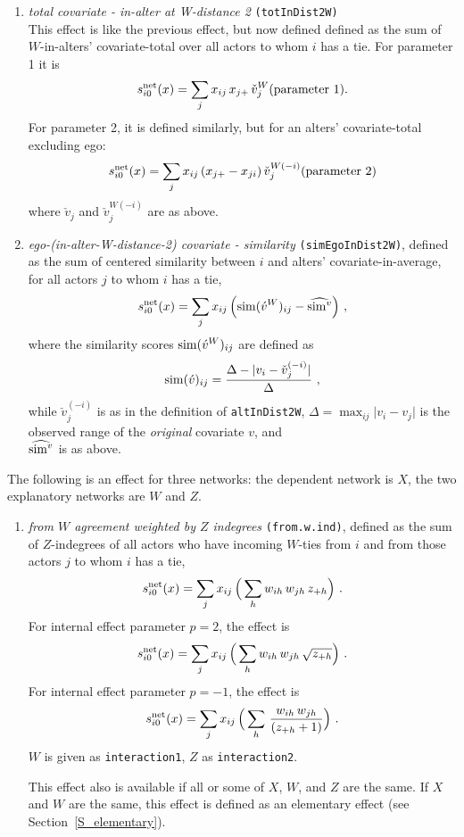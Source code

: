 \documentclass[a4paper,fleqn,11pt]{article}
\newcommand{\+}{\, + \,}
\newcommand{\vit}{\theenumi}
\newcounter{savenumi}
\begin{document}
\begin{enumerate}
\item \emph{total covariate - in-alter at W-distance 2} \texttt{(totInDist2W)} \\
      This effect is like the previous effect, but now defined
      defined as the sum of $W$-in-alters' covariate-total over all actors
      to whom $i$ has a tie. For parameter 1 it is
\[
 s^{\rm net}_{i\vit}(x) = \sum_j x_{ij}\, x_{j+} \, \check v_j^W \hfill (\text{parameter 1}). \hfill
\]
      For parameter 2, it is defined similarly,
      but for an alters' covariate-total excluding
      ego:
\[
 s^{\rm net}_{i\vit}(x) = \sum_j x_{ij} \, (x_{j+}  - x_{ji}) \,
               \check v_j^{W(-i)} \hfill (\text{parameter 2}) \hfill
\]
      where $ \check v_j$ and $ \check v_j^{W(-i)}$ are as above.

\item \emph{ego-(in-alter-W-distance-2) covariate - similarity} \texttt{(simEgoInDist2W)},
      defined as the sum of centered similarity  between $i$
      and alters' covariate-in-average, for all actors
      $j$ to whom $i$ has a tie,
\[
 s^{\rm net}_{i\vit}(x) = \sum_j x_{ij}\, \Big({\rm sim}(\acute v^W)_{ij}
  - \widehat{{\rm sim}^v}\Big) \ ,
\]
 where the similarity scores ${\rm sim}(\acute v^W)_{ij}$ are defined as
\[
{\rm sim}(\acute v)_{ij}=
 \frac{\Delta-\vert  v_i - \check v_j^{(-i)} \vert}{\Delta} \ ,
\]
 while
 $ \check v_j^{(-i)}$ is as in the definition of \texttt{altInDist2W},
 $\Delta=\max_{ij}\vert v_i - v_j \vert$ is the observed range of the
 \emph{original} covariate $v$, and\\
 $\widehat{{\rm sim}^v}$ is as above.

\setcounter{savenumi}{\value{enumi}}
\end{enumerate}

\noindent
The following is an effect for three networks:
the dependent network is $X$, the two explanatory networks are $W$ and $Z$.

\begin{enumerate}
\setcounter{enumi}{\value{savenumi}}
\item \emph{from $W$ agreement weighted by $Z$ indegrees} \texttt{(from.w.ind)},
      defined as the sum of $Z$-indegrees of all
      actors who have incoming $W$-ties from $i$ and from those actors
      $j$ to whom $i$ has a tie,
\[
 s^{\rm net}_{i\vit}(x) = \sum_j x_{ij}\,
        \Big( \sum_{h} w_{ih}\,w_{jh} \, z_{+h} \Big) \ .
\]
     For internal effect parameter $p=2$, the effect is
\[
 s^{\rm net}_{i\vit}(x) = \sum_j x_{ij}\,
        \Big( \sum_{h} w_{ih}\,w_{jh} \, \sqrt{ z_{+h}} \Big) \ .
\]
     For internal effect parameter $p=-1$, the effect is
\[
 s^{\rm net}_{i\vit}(x) = \sum_j x_{ij}\,
        \Big( \sum_{h} \, \frac{ w_{ih}\,w_{jh} }{( z_{+h}+1) } \Big) \ .
\]
    $W$ is given as \texttt{interaction1}, $Z$ as \texttt{interaction2}.

    This effect also is available if all or some of $X$, $W$, and $Z$ are the same.
    If $X$ and $W$ are the same, this effect is defined as an elementary effect
    (see Section~\ref{S_elementary}).
\setcounter{savenumi}{\value{enumi}}
\end{enumerate}
\end{document}
